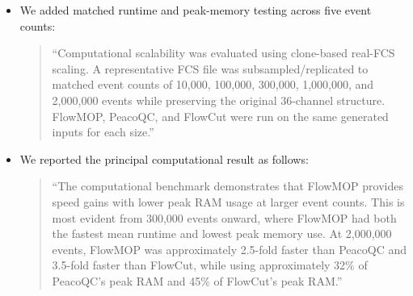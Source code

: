 \documentclass[
  11pt,
  a4paper,
]{article}
\begin{document}
\begin{itemize}
  \begin{quote}
  ``These measurements were obtained using local non-distributed
  execution and therefore demonstrate the performance of the tested
  implementations, not a distributed-computing speedup.''
  \end{quote}

  \begin{quote}
  ``Among the three evaluated decision structures, only FlowMOP exposes
  an inherently channel-parallel within-sample computation. After shared
  acquisition bins are defined, each eligible fluorescence channel
  independently establishes its reference, produces a fixed-shape
  time-bin summary, and applies smoothing and MAD filtering;
  cross-channel coordination occurs only in the final parameter vote.
  PeacoQC instead performs data-dependent peak identification and
  reconciliation across bin-channel combinations, while FlowCut applies
  adjacent-segment, contiguous-region, file-wide, and conditional rerun
  decisions
  {\color{revisionred}\sout{{[}5,9{]}.}}{\color{revisionblue}{[}5,6{]}.}
  Their suboperations and separate files can be parallelised, but their
  complete within-sample decision pipelines cannot be expressed as the
  same independent channel-wise reduction without changing their
  decision rules. Porting either implementation to another language or
  scheduling framework would therefore not remove these structural
  dependencies. This structural distinction, together with FlowMOP's
  earlier data reduction, fewer full-data passes, and smaller
  intermediate state, is consistent with its lower runtime and memory
  use in our benchmarks, although the benchmark does not independently
  establish causation.''
  \end{quote}
\item
  We added matched runtime and peak-memory testing across five event
  counts:

  \begin{quote}
  ``Computational scalability was evaluated using clone-based real-FCS
  scaling. A representative FCS file was subsampled/replicated to
  matched event counts of 10,000, 100,000, 300,000, 1,000,000, and
  2,000,000 events while preserving the original 36-channel structure.
  FlowMOP, PeacoQC, and FlowCut were run on the same generated inputs
  for each size.''
  \end{quote}
\item
  We reported the principal computational result as follows:

  \begin{quote}
  ``The computational benchmark demonstrates that FlowMOP provides speed
  gains with lower peak RAM usage at larger event counts. This is most
  evident from 300,000 events onward, where FlowMOP had both the fastest
  mean runtime and lowest peak memory use. At 2,000,000 events, FlowMOP
  was approximately 2.5-fold faster than PeacoQC and 3.5-fold faster
  than FlowCut, while using approximately 32\% of PeacoQC's peak RAM and
  45\% of FlowCut's peak RAM.''
  \end{quote}
\end{itemize}
\end{document}

